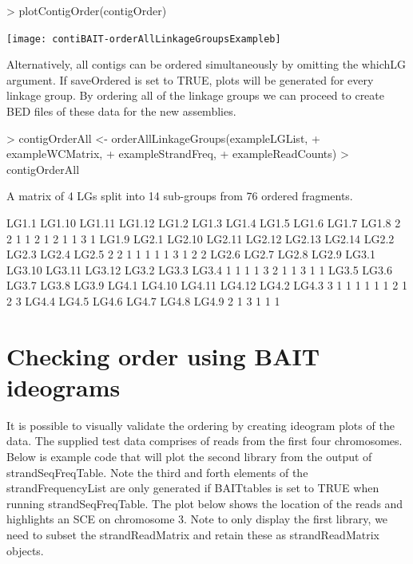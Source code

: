 \documentclass{article}
\begin{document}
\begin{Schunk}
\begin{Sinput}
> plotContigOrder(contigOrder)
\end{Sinput}
\end{Schunk}
\texttt{[image: contiBAIT-orderAllLinkageGroupsExampleb]}

Alternatively, all contigs can be ordered simultaneously by omitting the whichLG argument. If saveOrdered is set to TRUE, plots will be generated for every linkage group.  By ordering all of the linkage groups we can proceed to create BED files of these data for the new assemblies.

\begin{Schunk}
\begin{Sinput}
> contigOrderAll <- orderAllLinkageGroups(exampleLGList,
+ exampleWCMatrix,
+ exampleStrandFreq,
+ exampleReadCounts)
> contigOrderAll
\end{Sinput}
\begin{Soutput}
A matrix of 4 LGs split into 14 sub-groups from 76 ordered fragments.

 LG1.1 LG1.10 LG1.11 LG1.12  LG1.2  LG1.3  LG1.4  LG1.5  LG1.6  LG1.7  LG1.8 
     2      2      1      1      2      1      2      1      1      3      1 
 LG1.9  LG2.1 LG2.10 LG2.11 LG2.12 LG2.13 LG2.14  LG2.2  LG2.3  LG2.4  LG2.5 
     2      2      1      1      1      1      1      3      1      2      2 
 LG2.6  LG2.7  LG2.8  LG2.9  LG3.1 LG3.10 LG3.11 LG3.12  LG3.2  LG3.3  LG3.4 
     1      1      1      1      3      2      1      1      3      1      1 
 LG3.5  LG3.6  LG3.7  LG3.8  LG3.9  LG4.1 LG4.10 LG4.11 LG4.12  LG4.2  LG4.3 
     3      1      1      1      1      1      1      2      1      2      3 
 LG4.4  LG4.5  LG4.6  LG4.7  LG4.8  LG4.9 
     2      1      3      1      1      1 
\end{Soutput}
\end{Schunk}


\section{Checking order using BAIT ideograms}

It is possible to visually validate the ordering by creating ideogram plots of the data. The supplied test data comprises of reads from the first four chromosomes. Below is example code that will plot the second library from the output of strandSeqFreqTable. Note the third and forth elements of the strandFrequencyList are only generated if BAITtables is set to TRUE when running strandSeqFreqTable.  The plot below shows the location of the reads and highlights an SCE on chromosome 3. Note to only display the first library, we need to subset the strandReadMatrix and retain these as strandReadMatrix objects.
\end{document}

